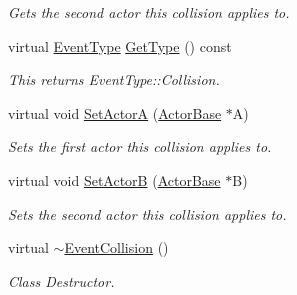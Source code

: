 \begin{DoxyCompactItemize}
\begin{DoxyCompactList}\small\item\em Gets the second actor this collision applies to. \item\end{DoxyCompactList}\item 
virtual \hyperlink{classMezzanine_1_1EventBase_ab85e31e97753b7e7ecb098f82526baef}{EventType} \hyperlink{classMezzanine_1_1EventCollision_af5d9f7eb0ee0ce22b0dd5dfbafc8f297}{GetType} () const 
\begin{DoxyCompactList}\small\item\em This returns EventType::Collision. \item\end{DoxyCompactList}\item 
virtual void \hyperlink{classMezzanine_1_1EventCollision_a90e9b3a89762db6a3c55aa262833bcd7}{SetActorA} (\hyperlink{classMezzanine_1_1ActorBase}{ActorBase} $\ast$A)
\begin{DoxyCompactList}\small\item\em Sets the first actor this collision applies to. \item\end{DoxyCompactList}\item 
virtual void \hyperlink{classMezzanine_1_1EventCollision_aef6da3acdc9879b21990cb25fa285304}{SetActorB} (\hyperlink{classMezzanine_1_1ActorBase}{ActorBase} $\ast$B)
\begin{DoxyCompactList}\small\item\em Sets the second actor this collision applies to. \item\end{DoxyCompactList}\item 
virtual \hyperlink{classMezzanine_1_1EventCollision_a72cabbfa2f7983d8b017755791e89632}{$\sim$EventCollision} ()
\begin{DoxyCompactList}\small\item\em Class Destructor. \item\end{DoxyCompactList}\end{DoxyCompactItemize}

